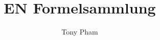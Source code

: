 \documentclass[a4paper,11pt]{article}
\title{EN Formelsammlung}
\author{Tony Pham}
\begin{document}
\maketitle
\tableofcontents
\twocolumn




\end{document}
